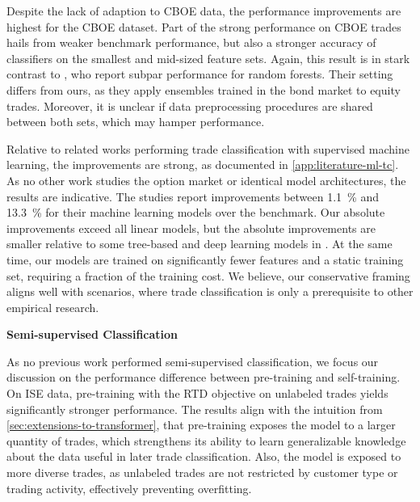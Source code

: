 Despite the lack of adaption to \gls{CBOE} data, the performance improvements are highest for the \gls{CBOE} dataset. Part of the strong performance on \gls{CBOE} trades hails from weaker benchmark performance, but also a stronger accuracy of classifiers on the smallest and mid-sized feature sets. Again, this result is in stark contrast to \textcite[][32]{ronenMachineLearningTrade2022}, who report subpar performance for random forests. Their setting differs from ours, as they apply ensembles trained in the bond market to equity trades. Moreover, it is unclear if data preprocessing procedures are shared between both sets, which may hamper performance. 

Relative to related works performing trade classification with supervised machine learning, the improvements are strong, as documented in \cref{app:literature-ml-tc}. As no other work studies the option market or identical model architectures, the results are indicative. The studies report improvements between \SI{1.1}{\percent} and \SI{13.3}{\percent} for their machine learning models over the benchmark. Our absolute improvements exceed all linear models, but the absolute improvements are smaller relative to some tree-based and deep learning models in \textcite[][49]{ronenMachineLearningTrade2022}. At the same time, our models are trained on significantly fewer features and a static training set, requiring a fraction of the training cost. We believe, our conservative framing aligns well with scenarios, where trade classification is only a prerequisite to other empirical research.

\vskip 1.3in

\textbf{Semi-supervised Classification}

As no previous work performed semi-supervised classification, we focus our discussion on the performance difference between pre-training and self-training. On \gls{ISE} data, pre-training with the \gls{RTD} objective on unlabeled trades yields significantly stronger performance. The results align with the intuition from \cref{sec:extensions-to-transformer}, that pre-training exposes the model to a larger quantity of trades, which strengthens its ability to learn generalizable knowledge about the data useful in later trade classification. Also, the model is exposed to more diverse trades, as unlabeled trades are not restricted by customer type or trading activity, effectively preventing overfitting.  

